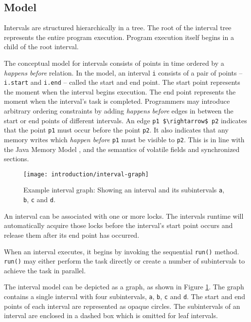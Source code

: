 \subsection{Model}
\label{sec:intro-intervals-model}

Intervals are structured hierarchically in a tree. The root of the
interval tree represents the entire program execution. Program
execution itself begins in a child of the root interval.

The conceptual model for intervals consists of points in time ordered
by a \emph{happens before} relation. In the model, an interval
\lstinline!i! consists of a pair of points -- \lstinline!i.start! and
\lstinline!i.end! -- called the start and end point. The start point
represents the moment when the interval begins execution. The end
point represents the moment when the interval's task is
completed. Programmers may introduce arbitrary ordering constraints by
adding \emph{happens before} edges in between the start or end points
of different intervals. An edge \lstinline!p1 $\rightarrow$ p2!
indicates that the point \lstinline!p1! must occur before the point
\lstinline!p2!. It also indicates that any memory writes which
\emph{happen before} \lstinline!p1! must be visible to
\lstinline!p2!. This is in line with the Java Memory Model
\cite{Manson2005}, and the semantics of volatile fields and
synchronized sections.

\begin{figure}[htb]
  \centering
  \texttt{[image: introduction/interval-graph]}
  \caption[Example interval graph]{Example interval graph: Showing an
    interval and its subintervals \lstinline!a!, \lstinline!b!,
    \lstinline!c! and \lstinline!d!.}
  \label{fig:introduction-interval-graph}
\end{figure}

An interval can be associated with one or more locks. The intervals
runtime will automatically acquire those locks before the interval's
start point occurs and release them after its end point has occurred.

When an interval executes, it begins by invoking the sequential
\lstinline!run()! method. \lstinline!run()! may either perform the
task directly or create a number of subintervals to achieve the task
in parallel.

The interval model can be depicted as a graph, as shown in Figure
\ref{fig:introduction-interval-graph}. The graph contains a single interval with
four subintervals, \lstinline!a!, \lstinline!b!, \lstinline!c! and
\lstinline!d!. The start and end points of each interval are
represented as opaque circles. The subintervals of an interval are
enclosed in a dashed box which is omitted for leaf intervals.

